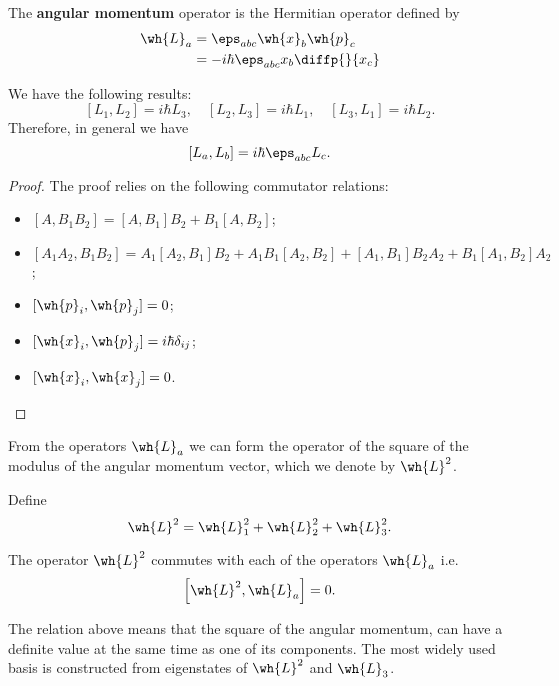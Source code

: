 \documentclass[12pt, a4paper]{article}
\begin{document}
\begin{definition}
    The \textbf{angular momentum} operator is the Hermitian operator defined by 
    \[\begin{aligned}
        \wh{L}_a &= \eps_{abc} \wh{x}_b \wh{p}_c \\
        &= -i\hbar \eps_{abc} x_b \diffp{}{{x_c}}
    \end{aligned}\]
\end{definition}

\begin{mdprop}
    We have the following results:
    \[\left[ L_1,L_2 \right] = i\hbar L_3, \quad \left[ L_2,L_3 \right] =i\hbar L_1 ,\quad \left[ L_3,L_1 \right]= i \hbar L_2.\]
    Therefore, in general we have 
    \[\left[ L_a,L_b \right] = i \hbar\eps_{abc}L_c.\]
\end{mdprop}

\begin{proof}
    The proof relies on the following commutator relations:
    \begin{itemize}
        \item \([A, B_1B_2] = [A, B_1]B_2 + B_1[A, B_2]\);
        \item \([A_1A_2, B_1B_2] = A_1[A_2, B_1]B_2 + A_1B_1[A_2, B_2] + [A_1, B_1]B_2A_2 + B_1[A_1, B_2]A_2\);
        \item \([\wh{p}_i, \wh{p}_j] = 0\);
        \item \([\wh{x}_i, \wh{p}_j] = i\hbar\delta_{ij}\);
        \item \([\wh{x}_i, \wh{x}_j] = 0\).
    \end{itemize}
\end{proof}

From the operators \(\wh{L}_a\) we can form the operator of the square of the modulus of the angular momentum vector, which we denote by \(\wh{L}^2\).

\begin{definition}
    Define 
    \[\wh{L}^2 =\wh{L}_1^2+\wh{L}_2^2+\wh{L}_3^2.\]
\end{definition}

\begin{mdthm}
    The operator \(\wh{L}^2\) commutes with each of the operators \(\wh{L}_a\) i.e.
    \[\left[ \wh{L}^2,\wh{L}_a \right]=0.\]
\end{mdthm}

\noindent The relation above means that the square of the angular momentum, can have a definite value at the same time as one of its components. The most widely used basis is constructed from eigenstates of \(\wh{L}^2\) and \(\wh{L}_3\).
\end{document}
